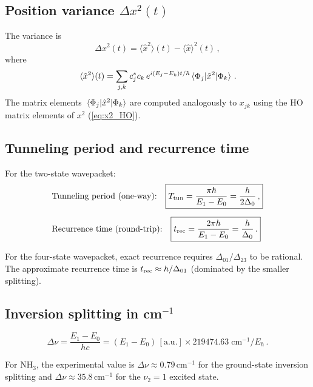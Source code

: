 \subsection{Position variance $\Delta x^2(t)$}

The variance is
\begin{equation}
  \Delta x^2(t) = \langle\hat{x}^2\rangle(t) - \langle\hat{x}\rangle^2(t)\,,
\end{equation}
where
\begin{equation}
  \langle\hat{x}^2\rangle(t) = \sum_{j,k}c_j^*c_k\,e^{i(E_j-E_k)t/\hbar}\mel{\Phi_j}{\hat{x}^2}{\Phi_k}\,.
\end{equation}
The matrix elements $\mel{\Phi_j}{\hat{x}^2}{\Phi_k}$ are computed analogously to $x_{jk}$
using the HO matrix elements of $x^2$ (\cref{eq:x2_HO}).

\subsection{Tunneling period and recurrence time}

For the two-state wavepacket:
\begin{align}
  &\text{Tunneling period (one-way):}\quad \boxed{T_{\text{tun}} = \frac{\pi\hbar}{E_1-E_0} = \frac{h}{2\Delta_0}\,,}\\[6pt]
  &\text{Recurrence time (round-trip):}\quad \boxed{t_{\text{rec}} = \frac{2\pi\hbar}{E_1-E_0} = \frac{h}{\Delta_0}\,.}
\end{align}

For the four-state wavepacket, exact recurrence requires $\Delta_{01}/\Delta_{23}$ to be
rational. The approximate recurrence time is $t_{\text{rec}} \approx h/\Delta_{01}$ (dominated by the
smaller splitting).

\subsection{Inversion splitting in cm$^{-1}$}

\begin{equation}
  \boxed{\Delta\nu = \frac{E_1 - E_0}{hc}
  = (E_1 - E_0)\,[\text{a.u.}]\times 219474.63\;\text{cm}^{-1}/E_h\,.}
\end{equation}

For NH$_3$, the experimental value is $\Delta\nu \approx 0.79\,\text{cm}^{-1}$ for the
ground-state inversion splitting and $\Delta\nu \approx 35.8\,\text{cm}^{-1}$ for the
$\nu_2 = 1$ excited state.

